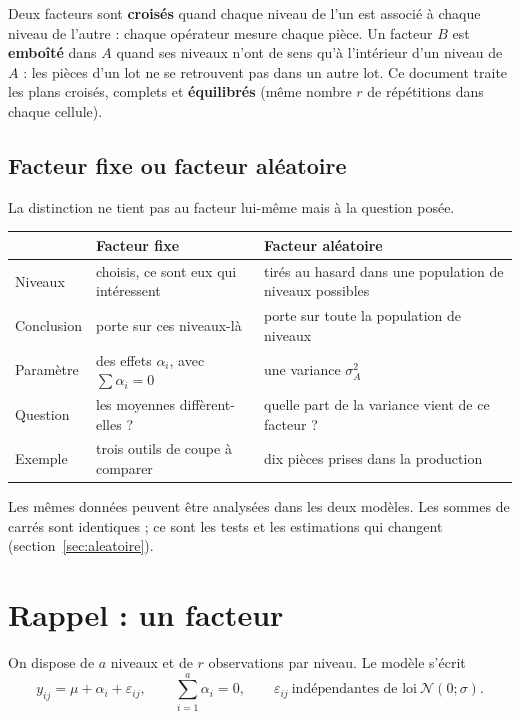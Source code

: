 \documentclass[11pt,a4paper]{article}
\theoremstyle{sj}
\theoremstyle{definition}
\theoremstyle{remark}
\newcommand{\N}{\mathcal{N}}
\begin{document}
Deux facteurs sont \textbf{croisés} quand chaque niveau de l'un est associé à chaque niveau de l'autre : chaque opérateur mesure chaque pièce. Un facteur $B$ est \textbf{emboîté} dans $A$ quand ses niveaux n'ont de sens qu'à l'intérieur d'un niveau de $A$ : les pièces d'un lot ne se retrouvent pas dans un autre lot. Ce document traite les plans croisés, complets et \textbf{équilibrés} (même nombre $r$ de répétitions dans chaque cellule).

\subsection{Facteur fixe ou facteur aléatoire}

La distinction ne tient pas au facteur lui-même mais à la question posée.

\begin{center}
\begin{tabularx}{\textwidth}{l X X}
\toprule
& \textbf{Facteur fixe} & \textbf{Facteur aléatoire}\\
\midrule
Niveaux & choisis, ce sont eux qui intéressent & tirés au hasard dans une population de niveaux possibles\\
Conclusion & porte sur ces niveaux-là & porte sur toute la population de niveaux\\
Paramètre & des effets $\alpha_i$, avec $\sum\alpha_i=0$ & une variance $\sigma_A^2$\\
Question & les moyennes diffèrent-elles ? & quelle part de la variance vient de ce facteur ?\\
Exemple & trois outils de coupe à comparer & dix pièces prises dans la production\\
\bottomrule
\end{tabularx}
\end{center}

Les mêmes données peuvent être analysées dans les deux modèles. Les sommes de carrés sont identiques ; ce sont les tests et les estimations qui changent (section~\ref{sec:aleatoire}).

\section{Rappel : un facteur}\label{sec:un}

On dispose de $a$ niveaux et de $r$ observations par niveau. Le modèle s'écrit
\[
y_{ij}=\mu+\alpha_i+\varepsilon_{ij},\qquad \sum_{i=1}^a\alpha_i=0,\qquad \varepsilon_{ij}\ \text{indépendantes de loi}\ \N(0;\sigma).
\]
\end{document}

